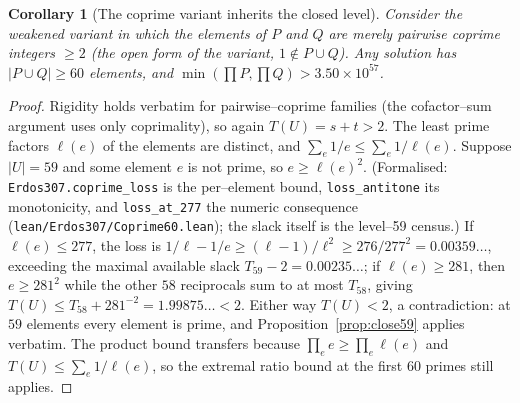 \documentclass[11pt]{article}
\newtheorem{corollary}[theorem]{Corollary}
\theoremstyle{definition}
\begin{document}
\begin{corollary}[The coprime variant inherits the closed level]\label{cor:coprime60}
Consider the weakened variant in which the elements of $P$ and $Q$ are merely pairwise coprime
integers $\ge2$ \textup{(}the open form of the variant, $1\notin P\cup Q$\textup{)}. Any solution
has $|P\cup Q|\ge 60$ elements, and $\min(\prod P,\prod Q)>3.50\times10^{57}$.
\end{corollary}
\begin{proof}
Rigidity holds verbatim for pairwise--coprime families (the cofactor--sum argument uses only
coprimality), so again $T(U)=s+t>2$. The least prime factors $\ell(e)$ of the elements are distinct,
and $\sum_e 1/e\le\sum_e1/\ell(e)$. Suppose $|U|=59$ and some element $e$ is not prime, so
$e\ge\ell(e)^2$. \textup{(}Formalised: \texttt{Erdos307.coprime\_loss} is the per--element bound,
\texttt{loss\_antitone} its monotonicity, and \texttt{loss\_at\_277} the numeric consequence
\textup{(}\texttt{lean/Erdos307/Coprime60.lean}\textup{)}; the slack itself is the level--59
census.\textup{)} If $\ell(e)\le277$, the loss is
$1/\ell-1/e\ge(\ell-1)/\ell^2\ge276/277^2=0.00359\ldots$, exceeding the maximal available slack
$T_{59}-2=0.00235\ldots$; if $\ell(e)\ge281$, then $e\ge281^2$ while the other $58$ reciprocals sum
to at most $T_{58}$, giving $T(U)\le T_{58}+281^{-2}=1.99875\ldots<2$. Either way $T(U)<2$, a
contradiction: at $59$ elements every element is prime, and Proposition~\ref{prop:close59} applies
verbatim. The product bound transfers because $\prod_e e\ge\prod_e\ell(e)$ and
$T(U)\le\sum_e1/\ell(e)$, so the extremal ratio bound at the first $60$ primes still applies.
\end{proof}
\end{document}

